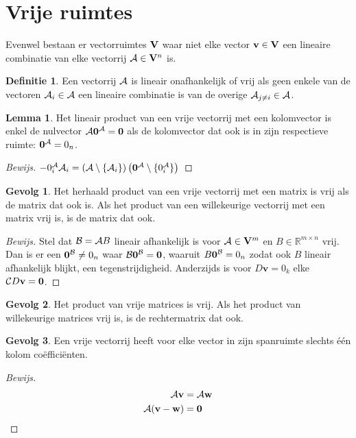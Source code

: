 \documentclass{amsart}
\theoremstyle{definition}
\newtheorem{lmm}{Lemma}[section]
\newtheorem{dfn}{Definitie}[section]
\newtheorem{csq}{Gevolg}[section]
\newenvironment{bewijs}{\begin{proof}[Bewijs]}{\end{proof}}
\newcommand{\setsm}[1]{\{{#1}\}}
\newcommand{\without}[1]{\setminus\setsm{#1}}
\newcommand{\realnums}{\mathbb{R}}
\newcommand{\realn}[1][n]{\realnums^{#1}}
\newcommand{\realmx}[2][n]{\realn[#2 \times #1]}
\newcommand{\realmxn}{\realmx{m}}
\newcommand{\vecspace}[1][v]{\mathrm{\mathbf{\MakeUppercase#1}}}
\newcommand{\vecspacen}[1][n]{\vecspace^#1}
\newcommand{\vvec}[1][v]{\mathbf{#1}}
\newcommand{\zerovec}{\vvec[0]}
\newcommand{\vecrow}[1][a]{\mathcal{\MakeUppercase{#1}}}
\newcommand{\rvec}[2][i]{{#2}_{#1}}
\newcommand{\rvecr}[2][i]{\rvec[#1]{\vecrow[#2]}}
\newcommand{\rveci}[1][i]{\rvecr[#1]{a}}
\newcommand{\cvec}[2]{{#1}^{#2}}
\newcommand{\cvecv}[2][v]{\cvec{\vvec[#1]}{#2}}
\newcommand{\cvecc}[2][a]{\cvecv[#2]{\vecrow[#1]}}
\newcommand{\cvecvv}[1][v]{\cvecc{#1}}
\newcommand{\vcord}[3]{{#1}_{#2}^{#3}}
\newcommand{\vcorda}[3][a]{\vcord{#2}{#3}{\vecrow[#1]}}
\newcommand{\vcordai}[2][i]{\vcorda{#2}{#1}}
\begin{document}
\section{Vrije ruimtes}

Evenwel bestaan er vectorruimtes $\vecspace$ waar niet elke vector $\vvec \in \vecspace$ een lineaire combinatie van elke vectorrij $\vecrow \in \vecspacen$ is.

\begin{dfn}
	Een vectorrij $\vecrow$ is lineair onafhankelijk of vrij als geen enkele van de vectoren $\vecrow_i \in \vecrow$ een lineaire combinatie is van de overige $\vecrow_{j\neq i} \in \vecrow$.
\end{dfn}

\begin{lmm}
	Het lineair product van een vrije vectorrij met een kolomvector is enkel de nulvector $\vecrow \cvecvv[0] = \zerovec$ als de kolomvector dat ook is in zijn respectieve ruimte: $\cvecvv[0] = 0_n$.
	\begin{bewijs}
		$-\vcordai 0 \vecrow_i = \left(\vecrow \without{\rveci}\right)\left(\cvecvv[0] \without{\vcordai 0}\right)$
	\end{bewijs}
\end{lmm}

\begin{csq}
	Het herhaald product van een vrije vectorrij met een matrix is vrij als de matrix dat ook is. Als het product van een willekeurige vectorrij met een matrix vrij is, is de matrix dat ook.
	\begin{bewijs}
		Stel dat $\vecrow[b] = \vecrow B$ lineair afhankelijk is voor $\vecrow \in \vecspacen[m]$ en $B \in \realmxn$ vrij.
		Dan is er een $\cvecc[b]{0} \neq 0_n$ waar $\vecrow[b] \cvecc[b]{0} = \zerovec$, waaruit $B \cvecc[b]{0} = 0_n$ zodat ook $B$ lineair afhankelijk blijkt, een tegenstrijdigheid.
		Anderzijds is voor $D\vvec = 0_k$ elke $\vecrow[c] D\vvec = \zerovec$.
	\end{bewijs}
\end{csq}

\begin{csq}
	Het product van vrije matrices is vrij. Als het product van willekeurige matrices vrij is, is de rechtermatrix dat ook.
\end{csq}

\begin{csq}
	Een vrije vectorrij heeft voor elke vector in zijn spanruimte slechts één kolom coëfficiënten.
	\begin{bewijs}
		\begin{align*}
			\vecrow \vvec                 & = \vecrow \vvec[w] \\
			\vecrow (\vvec - \vvec[w]) & = \zerovec
		\end{align*}
	\end{bewijs}
\end{csq}
\end{document}
